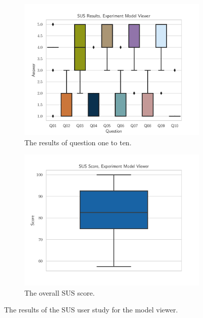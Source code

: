 \begin{figure}[H]
  \centering
  \begin{subfigure}{.45\textwidth}%
    \centering
    \includegraphics[width=\textwidth]{figures/evaluation/res_exp_mv.pdf}
    \caption{The results of question one to ten.}\label{fig:res-exp-mv}
  \end{subfigure}%
  \hspace{0.1\textwidth}%
  \begin{subfigure}{.45\textwidth}%
    \centering
    \includegraphics[width=\textwidth]{figures/evaluation/score_exp_mv.pdf}
    \caption{The overall \ac{SUS} score.}\label{fig:score-exp-mv}
  \end{subfigure}%
  \caption[User study results of the model viewer experiment]{The results of the \ac{SUS} user study for the model viewer.}\label{fig:exp-mv-stats}
\end{figure}

